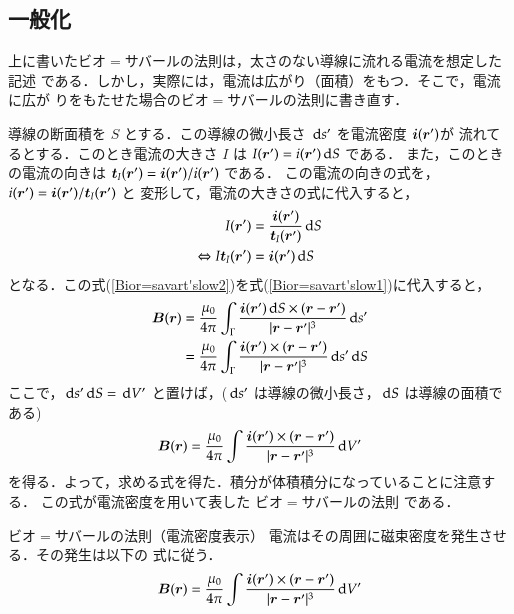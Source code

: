     \subsection{一般化}\label{subsec:BiotSavart_Gene}
        上に書いたビオ$=$サバールの法則は，太さのない導線に流れる電流を想定した記述
        である．しかし，実際には，電流は広がり（面積）をもつ．そこで，電流に広が
        りをもたせた場合のビオ$=$サバールの法則に書き直す．

        導線の断面積を $S$ とする．この導線の微小長さ $\,\mathrm{d} s'$ を電流密度 $\boldsymbol{i}(\boldsymbol{r}')$が
        流れてるとする．このとき電流の大きさ $I$ は $I(\boldsymbol{r}')=i(\boldsymbol{r}')\,\mathrm{d} S$ である．
        また，このときの電流の向きは $\boldsymbol{t}_{I}(\boldsymbol{r}')
        =\boldsymbol{i}(\boldsymbol{r}')/i(\boldsymbol{r}')$ である．
        この電流の向きの式を，$i(\boldsymbol{r}')=\boldsymbol{i}(\boldsymbol{r}')
        /\boldsymbol{t}_{I}(\boldsymbol{r}')$ と
        変形して，電流の大きさの式に代入すると，
            \begin{align}\label{Bior=savart'slow2}
                I(\br')&=\frac{\bi(\br')}{\bt_{I}
                (\br')}\df S \notag \\
                \Leftrightarrow
                I\bt_{I}(\br')&=\bi(\br')\df S
            \end{align}
        となる．この式(\ref{Bior=savart'slow2})を式(\ref{Bior=savart'slow1})に代入すると，
            \begin{align*}
                \boldsymbol{B}(\boldsymbol{r})
                &=\frac{\mu_{0}}{4\pi}
                \int_{\Gamma}\frac{\boldsymbol{i}(\boldsymbol{r}')\,\mathrm{d} S\times
                (\boldsymbol{r}-\boldsymbol{r}')
                }{|\boldsymbol{r}-\boldsymbol{r}'|^{3}}\,\mathrm{d} s'  \\
                &=\frac{\mu_{0}}{4\pi}
                \int_{\Gamma}\frac{\boldsymbol{i}(\boldsymbol{r}')\times
                (\boldsymbol{r}-\boldsymbol{r}')
                }{|\boldsymbol{r}-\boldsymbol{r}'|^{3}}\,\mathrm{d} s'\,\mathrm{d} S
            \end{align*}
        ここで，$\,\mathrm{d} s'\,\mathrm{d} S=\,\mathrm{d} V'$ と置けば，($\,\mathrm{d} s'$ は導線の微小長さ，$\,\mathrm{d} S$ は導線の面積である)
            \begin{align*}
                \boldsymbol{B}(\boldsymbol{r})
                =\frac{\mu_{0}}{4\pi}
                \int\frac{\boldsymbol{i}(\boldsymbol{r}')\times
                (\boldsymbol{r}-\boldsymbol{r}')
                }{|\boldsymbol{r}-\boldsymbol{r}'|^{3}}\,\mathrm{d} V'
            \end{align*}
        を得る．よって，求める式を得た．積分が体積積分になっていることに注意する．
        この式が電流密度を用いて表した ビオ$=$サバールの法則 である．
            \begin{myshadebox}{ビオ$=$サバールの法則（電流密度表示）}
                電流はその周囲に磁束密度を発生させる．その発生は以下の
                式に従う．
                \begin{align}
                    \boldsymbol{B}(\boldsymbol{r})
                    =\frac{\mu_{0}}{4\pi}
                    \int\frac{\boldsymbol{i}(\boldsymbol{r}')\times
                    (\boldsymbol{r}-\boldsymbol{r}')
                    }{|\boldsymbol{r}-\boldsymbol{r}'|^{3}}\,\mathrm{d} V'
                \end{align}
            \end{myshadebox}
